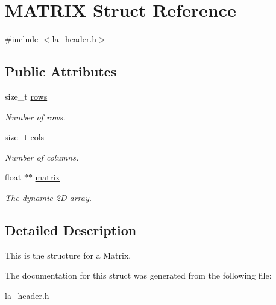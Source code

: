 \hypertarget{structMATRIX}{\section{M\-A\-T\-R\-I\-X Struct Reference}
\label{structMATRIX}
}


{\ttfamily \#include $<$la\-\_\-header.\-h$>$}

\subsection*{Public Attributes}
\begin{DoxyCompactItemize}
\item 
\hypertarget{structMATRIX_a35aca49172760dc3ebfd87cfb09c640e}{size\-\_\-t \hyperlink{structMATRIX_a35aca49172760dc3ebfd87cfb09c640e}{rows}}\label{structMATRIX_a35aca49172760dc3ebfd87cfb09c640e}

\begin{DoxyCompactList}\small\item\em Number of rows. \end{DoxyCompactList}\item 
\hypertarget{structMATRIX_abed4f2973053f5090c9ae3a4fe7e00d7}{size\-\_\-t \hyperlink{structMATRIX_abed4f2973053f5090c9ae3a4fe7e00d7}{cols}}\label{structMATRIX_abed4f2973053f5090c9ae3a4fe7e00d7}

\begin{DoxyCompactList}\small\item\em Number of columns. \end{DoxyCompactList}\item 
\hypertarget{structMATRIX_a1b56eebd963b3128d1ed05eaabb73362}{float $\ast$$\ast$ \hyperlink{structMATRIX_a1b56eebd963b3128d1ed05eaabb73362}{matrix}}\label{structMATRIX_a1b56eebd963b3128d1ed05eaabb73362}

\begin{DoxyCompactList}\small\item\em The dynamic 2\-D array. \end{DoxyCompactList}\end{DoxyCompactItemize}


\subsection{Detailed Description}
This is the structure for a Matrix. 

The documentation for this struct was generated from the following file\-:\begin{DoxyCompactItemize}
\item 
\hyperlink{la__header_8h}{la\-\_\-header.\-h}\end{DoxyCompactItemize}
